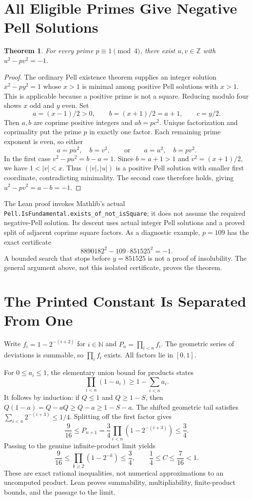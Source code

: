 \documentclass[11pt]{article}
\newtheorem{theorem}{Theorem}
\newcommand{\Z}{\mathbb Z}
\newcommand{\N}{\mathbb N}
\begin{document}
\section{All Eligible Primes Give Negative Pell Solutions}
\begin{theorem}
For every prime $p\equiv1\pmod4$, there exist $u,v\in\Z$ with
$u^2-pv^2=-1$.
\end{theorem}
\begin{proof}
The ordinary Pell existence theorem supplies an integer solution
$x^2-py^2=1$ whose $x>1$ is minimal among positive Pell solutions with
$x>1$. This is applicable because a positive prime is not a square.
Reducing modulo four shows $x$ odd and $y$ even. Set
\[
 a=(x-1)/2>0,\qquad b=(x+1)/2=a+1,\qquad c=y/2.
\]
Then $a,b$ are coprime positive integers and $ab=pc^2$. Unique factorization
and coprimality put the prime $p$ in exactly one factor. Each remaining prime
exponent is even, so either
\[
 a=pu^2,\quad b=v^2,\qquad\text{or}\qquad
 a=u^2,\quad b=pv^2.
\]
In the first case $v^2-pu^2=b-a=1$. Since $b=a+1>1$ and
$v^2=(x+1)/2$, we have $1<|v|<x$. Thus $(|v|,|u|)$ is a positive Pell
solution with smaller first coordinate, contradicting minimality. The second
case therefore holds, giving $u^2-pv^2=a-b=-1$.
\end{proof}

The Lean proof invokes Mathlib's actual
\texttt{Pell.IsFundamental.exists\_of\_not\_isSquare}; it does not assume
the required negative-Pell solution. Its descent uses actual integer Pell
solutions and a proved split of adjacent coprime square factors. As a diagnostic
example, $p=109$ has the exact certificate
\[
 8890182^2-109\cdot851525^2=-1.
\]
A bounded search that stops before $y=851525$ is not a proof of insolubility.
The general argument above, not this isolated certificate, proves the theorem.

\section{The Printed Constant Is Separated From One}
Write $f_i=1-2^{-(i+2)}$ for $i\in\N$ and $P_n=\prod_{i<n}f_i$.
The geometric series of deviations is summable, so $\prod_i f_i$ exists.
All factors lie in $[0,1]$.

For $0\le a_i\le1$, the elementary union bound for products states
\[
 \prod_{i<n}(1-a_i)\ge1-\sum_{i<n}a_i.
\]
It follows by induction: if $Q\le1$ and $Q\ge1-S$, then
$Q(1-a)=Q-aQ\ge Q-a\ge1-S-a$. The shifted geometric tail satisfies
$\sum_{i<n}2^{-(i+3)}\le1/4$. Splitting off the first factor gives
\[
 \frac9{16}\le P_{n+1}
 =\frac34\prod_{i<n}(1-2^{-(i+3)})\le\frac34.
\]
Passing to the genuine infinite-product limit yields
\[
 \frac9{16}\le\prod_{k\ge2}(1-2^{-k})\le\frac34,
 \qquad \frac14\le C\le\frac7{16}<1.
\]
These are exact rational inequalities, not numerical approximations to an
uncomputed product. Lean proves summability, multipliability, finite-product
bounds, and the passage to the limit.
\end{document}
